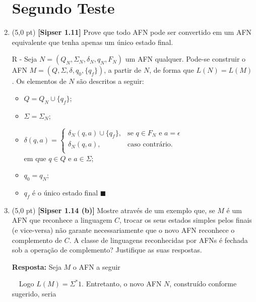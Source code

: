 \documentclass[12pt,a4paper,oneside]{article}
\begin{document}
\begin{enumerate}
	\newpage

	\section*{Segundo Teste}
	
	\item (5,0 pt) {\bf [Sipser 1.11]}  Prove que todo AFN pode ser convertido em um AFN equivalente que tenha apenas um único estado final.
	
	\vspace*{0.1cm}
	
	{\color{blue} R - Seja $N = (Q_N, \Sigma_N, \delta_N, q_N, F_N)$ um AFN qualquer. Pode-se construir o AFN $M = (Q, \Sigma, \delta, q_0, \{ q_f \})$, a partir de  $N$, de forma que $L(N) = L(M)$. Os elementos de $N$ são descritos a seguir:
		\begin{itemize}
			\item $Q = Q_N \cup \{q_f\}$;
			\item $\Sigma = \Sigma_N$;
			\item $\delta(q,a) = \left\{\begin{array}{cl}
			\delta_N(q,a) \cup \{ q_f \}, 			& \text{se } q \in F_N \text{ e } a=\epsilon\\
			\delta_N(q,a), 		& \text{caso contrário.}\\
			\end{array} \right.$\\
			em que $q \in Q$ e $a \in \Sigma$;
			\item $q_0 = q_N$;
			\item $q_f$ é o único estado final $\blacksquare$
			
		\end{itemize}
	}
	
	\item (5,0 pt) {\bf [Sipser 1.14 (b)]} Mostre através de um exemplo que, se $M$ é um AFN que reconhece a linguagem $C$, trocar os seus estados simples pelos finais (e vice-versa) não garante necessariamente que o novo AFN reconhece o complemento de $C$. A classe de linguagens reconhecidas por AFNs é fechada sob a operação de complemento? Justifique as suas respostas.
	
	\vspace*{0.3cm}
	
	{\color{blue} {\bf Resposta:} Seja $M$ o AFN a seguir
		
		 \ \ Logo $L(M) = \Sigma^*1$. Entretanto, o novo AFN $N$, construído conforme sugerido, seria
		
}
\end{enumerate}
\end{document}
